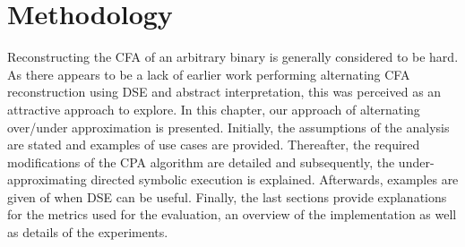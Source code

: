 \documentclass{kththesis}
\newcommand{\fbcomment}[1]{{#1}}
\renewcommand{\fbcomment}[1]{}
\begin{document}
\chapter{Methodology}\label{chap:methodlogy}
\fbcomment{\color{red}Goal: Describe what has been done and why.}
%
Reconstructing the CFA of an arbitrary binary is generally considered to be hard\cite{Jakstab}. As there appears to be a lack of earlier work performing alternating CFA reconstruction using DSE and abstract interpretation, this was perceived as an attractive approach to explore. In this chapter, our approach of alternating over/under approximation is presented. Initially, the assumptions of the analysis are stated and examples of use cases are provided. Thereafter, the required modifications of the CPA algorithm are detailed and subsequently, the under-approximating directed symbolic execution is explained. Afterwards, examples are given of when DSE can be useful. Finally, the last sections provide explanations for the metrics used for the evaluation, an overview of the implementation as well as details of the experiments.
\clearpage
\end{document}

